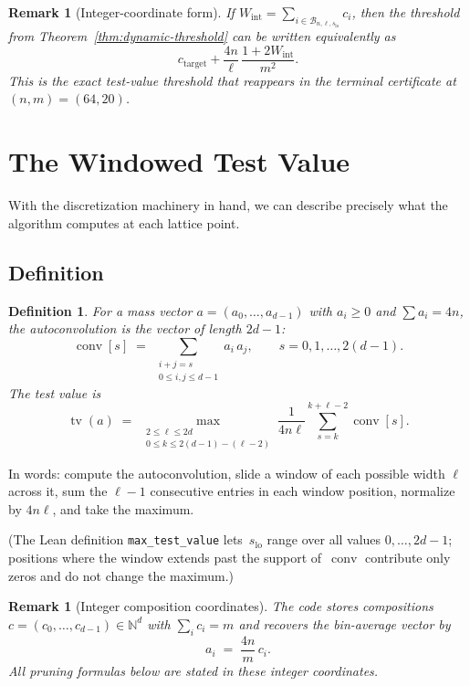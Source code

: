 \documentclass[11pt, letterpaper]{article}
\theoremstyle{paperplain}
\theoremstyle{paperdef}
\newtheorem{definition}[theorem]{Definition}
\newtheorem{remark}[theorem]{Remark}
\newcommand{\N}{\mathbb{N}}
\newcommand{\tv}{\operatorname{tv}}
\newcommand{\conv}{\operatorname{conv}}
\begin{document}
\begin{remark}[Integer-coordinate form]
If
$W_{\mathrm{int}}=\sum_{i\in\mathcal{B}_{n,\ell,s_{\mathrm{lo}}}} c_i$,
then the threshold from
Theorem~\ref{thm:dynamic-threshold} can be written equivalently as
\[
  c_{\mathrm{target}}
  +
  \frac{4n}{\ell}\,
  \frac{1+2W_{\mathrm{int}}}{m^2}.
\]
This is the exact test-value threshold that reappears in the terminal
certificate at $(n,m)=(64,20)$.
\end{remark}

\section{The Windowed Test Value}\label{sec:testvalue}

With the discretization machinery in hand, we can describe precisely
what the algorithm computes at each lattice point.

\subsection{Definition}

\begin{definition}
For a mass vector $a = (a_0, \ldots, a_{d-1})$ with $a_i \ge 0$ and
$\sum a_i = 4n$, the \emph{autoconvolution} is the vector of length
$2d - 1$:
\[
  \conv[s] \;=\; \sum_{\substack{i + j = s \\[1pt] 0 \le i,j \le d-1}}
  a_i\, a_j,
  \qquad s = 0, 1, \ldots, 2(d-1).
\]
The \emph{test value} is
\[
  \tv(a) \;=\;
  \max_{\substack{2 \le \ell \le 2d \\[2pt] 0 \le k \le 2(d-1) - (\ell-2)}}
  \frac{1}{4n\ell}
  \sum_{s=k}^{k+\ell-2} \conv[s].
\]
\end{definition}

In words: compute the autoconvolution, slide a window of each possible
width $\ell$ across it, sum the $\ell - 1$ consecutive entries in each
window position, normalize by $4n\ell$, and take the maximum.

(The Lean definition \texttt{max\_test\_value} lets~$s_{\mathrm{lo}}$
range over all values $0,\dots,2d-1$; positions where the window extends
past the support of~$\conv$ contribute only zeros and do not change the
maximum.)

\begin{remark}[Integer composition coordinates]
The code stores compositions
$c=(c_0,\ldots,c_{d-1}) \in \N^d$ with $\sum_i c_i = m$ and recovers
the bin-average vector by
\[
  a_i \;=\; \frac{4n}{m}\,c_i.
\]
All pruning formulas below are stated in these integer
coordinates.
\end{remark}
\end{document}
